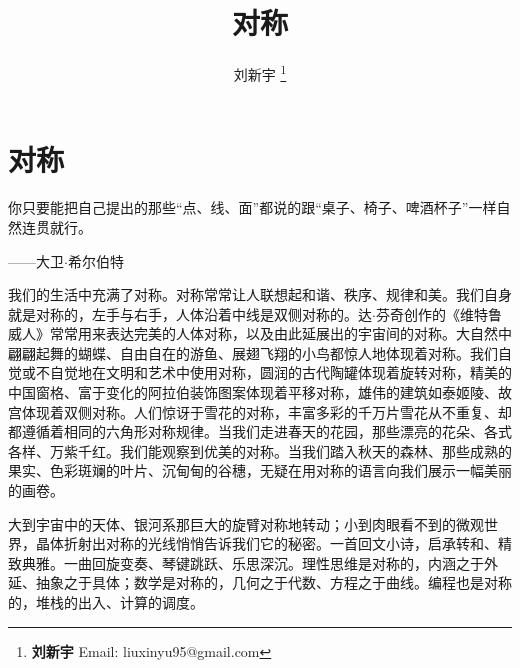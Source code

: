 \documentclass[b5paper]{ctexart}
\begin{document}
\title{对称}

\author{刘新宇
\thanks{{\bfseries 刘新宇} \newline
  Email: liuxinyu95@gmail.com \newline}
  }

\maketitle
\fi


\ifx\wholebook\relax
\chapter{对称}
\fi

\epigraph{你只要能把自己提出的那些“点、线、面”都说的跟“桌子、椅子、啤酒杯子”一样自然连贯就行。}{——大卫$\cdot$希尔伯特}


我们的生活中充满了对称。对称常常让人联想起和谐、秩序、规律和美。我们自身就是对称的，左手与右手，人体沿着中线是双侧对称的。达$\cdot$芬奇创作的《维特鲁威人》常常用来表达完美的人体对称，以及由此延展出的宇宙间的对称。大自然中翩翩起舞的蝴蝶、自由自在的游鱼、展翅飞翔的小鸟都惊人地体现着对称。我们自觉或不自觉地在文明和艺术中使用对称，圆润的古代陶罐体现着旋转对称，精美的中国窗格、富于变化的阿拉伯装饰图案体现着平移对称，雄伟的建筑如泰姬陵、故宫体现着双侧对称。人们惊讶于雪花的对称，丰富多彩的千万片雪花从不重复、却都遵循着相同的六角形对称规律。当我们走进春天的花园，那些漂亮的花朵、各式各样、万紫千红。我们能观察到优美的对称。当我们踏入秋天的森林、那些成熟的果实、色彩斑斓的叶片、沉甸甸的谷穗，无疑在用对称的语言向我们展示一幅美丽的画卷。

大到宇宙中的天体、银河系那巨大的旋臂对称地转动；小到肉眼看不到的微观世界，晶体折射出对称的光线悄悄告诉我们它的秘密。一首回文小诗，启承转和、精致典雅。一曲回旋变奏、琴键跳跃、乐思深沉。理性思维是对称的，内涵之于外延、抽象之于具体；数学是对称的，几何之于代数、方程之于曲线。编程也是对称的，堆栈的出入、计算的调度。
\end{document}
